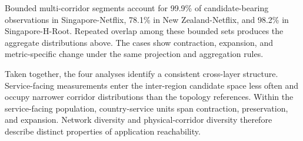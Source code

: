 Bounded multi-corridor segments account for 99.9\% of candidate-bearing
observations in Singapore-Netflix, 78.1\% in New Zealand-Netflix, and 98.2\%
in Singapore-H-Root. Repeated overlap among these bounded sets produces the
aggregate distributions above. The cases show contraction, expansion, and
metric-specific change under the same projection and aggregation rules.

Taken together, the four analyses identify a consistent cross-layer structure.
Service-facing measurements enter the inter-region candidate space less often
and occupy narrower corridor distributions than the topology references.
Within the service-facing population, country-service units span contraction,
preservation, and expansion. Network diversity and physical-corridor diversity
therefore describe distinct properties of application reachability.
